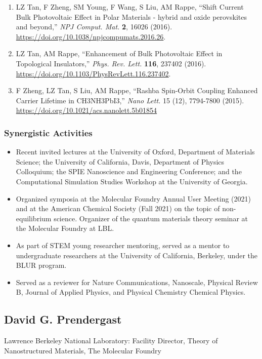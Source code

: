 \begin{enumerate}
    \item LZ Tan, F Zheng, SM Young, F Wang, S Liu, AM Rappe, “Shift Current Bulk Photovoltaic Effect in Polar Materials - hybrid and oxide perovskites and beyond,” {\it NPJ Comput. Mat.} {\bf 2}, 16026 (2016). \url{https://doi.org/10.1038/npjcompumats.2016.26}.
    \item LZ Tan, AM Rappe, “Enhancement of Bulk Photovoltaic Effect in Topological Insulators,” {\it Phys. Rev. Lett.} {\bf 116}, 237402 (2016). \url{https://doi.org/10.1103/PhysRevLett.116.237402}.
    \item F Zheng, LZ Tan, S Liu, AM Rappe, “Rashba Spin-Orbit Coupling Enhanced Carrier Lifetime in CH3NH3PbI3,” {\it Nano Lett.} 15 (12), 7794-7800 (2015). \url{https://doi.org/10.1021/acs.nanolett.5b01854}
\end{enumerate}

\subsubsection*{Synergistic Activities}
\begin{itemize}
    \item Recent invited lectures at the University of Oxford, Department of Materials Science; the University of California, Davis, Department of Physics Colloquium; the SPIE Nanoscience and Engineering Conference; and the Computational Simulation Studies Workshop at the University of Georgia. 
    \item Organized symposia at the Molecular Foundry Annual User Meeting (2021) and at the American Chemical Society (Fall 2021) on the topic of non-equilibrium science. Organizer of the quantum materials theory seminar at the Molecular Foundry at LBL. 
    \item As part of STEM young researcher mentoring, served as a mentor to undergraduate researchers at the University of California, Berkeley, under the BLUR program. 
    \item Served as a reviewer for Nature Communications, Nanoscale, Physical Review B, Journal of Applied Physics, and Physical Chemistry Chemical Physics.  
\end{itemize}

\clearpage

\subsection*{David G. Prendergast}

Lawrence Berkeley National Laboratory: Facility Director, Theory of Nanostructured Materials, The Molecular Foundry

